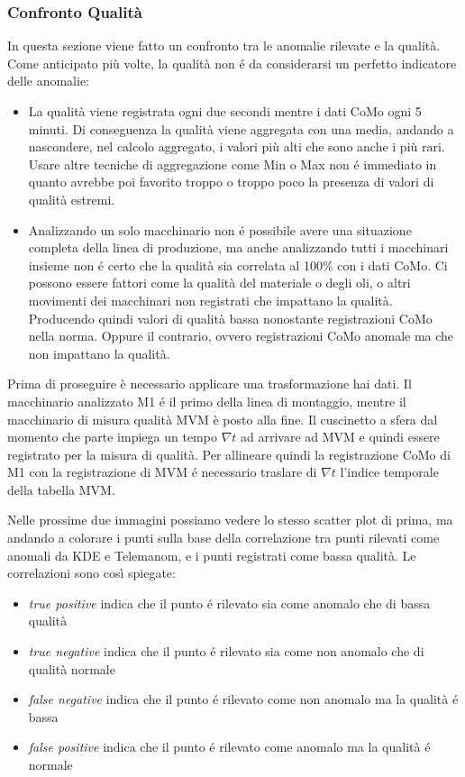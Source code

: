 \subsubsection{Confronto Qualità}
In questa sezione viene fatto un confronto tra le anomalie rilevate e la qualità. Come anticipato più volte, la qualità non é da considerarsi un perfetto indicatore delle anomalie: 
\begin{itemize}
	\item La qualità viene registrata ogni due secondi mentre i dati CoMo ogni 5 minuti. Di conseguenza la qualità viene aggregata con una media, andando a nascondere, nel calcolo aggregato, i valori più alti che sono anche i più rari. Usare altre tecniche di aggregazione come Min o Max non é immediato in quanto avrebbe poi favorito troppo o troppo poco la presenza di valori di qualità estremi.
	\item Analizzando un solo macchinario non é possibile avere una situazione completa della linea di produzione, ma anche analizzando tutti i macchinari insieme non é certo che la qualità sia correlata al 100\% con i dati CoMo. Ci possono essere fattori come la qualità del materiale o degli oli, o altri movimenti dei macchinari non registrati che impattano la qualità. Producendo quindi valori di qualità bassa nonostante registrazioni CoMo nella norma. Oppure il contrario, ovvero registrazioni CoMo anomale ma che non impattano la qualità.
\end{itemize}

Prima di proseguire è  necessario applicare una trasformazione hai dati. Il macchinario analizzato M1 é il primo della linea di montaggio, mentre il macchinario di misura qualità MVM è  posto alla fine. Il cuscinetto a sfera dal momento che parte impiega un tempo ${\nabla}t$ ad arrivare ad MVM e quindi essere registrato per la misura di qualità. Per allineare quindi la registrazione CoMo di M1 con la registrazione di MVM é necessario traslare di ${\nabla}t$ l'indice temporale della tabella MVM.

Nelle prossime due immagini possiamo vedere lo stesso scatter plot di prima, ma andando a colorare i punti sulla base della correlazione tra punti rilevati come anomali da KDE e Telemanom, e i punti registrati come bassa qualità. Le correlazioni sono così spiegate:
\begin{itemize}
	\item \textit{true positive} indica che il punto é rilevato sia come anomalo che di bassa qualità
	\item \textit{true negative} indica che il punto é rilevato sia come non anomalo che di qualità normale
	\item \textit{false negative} indica che il punto é rilevato come non anomalo ma la qualità é bassa
	\item \textit{false positive} indica che il punto é rilevato come anomalo ma la qualità é normale
\end{itemize}

